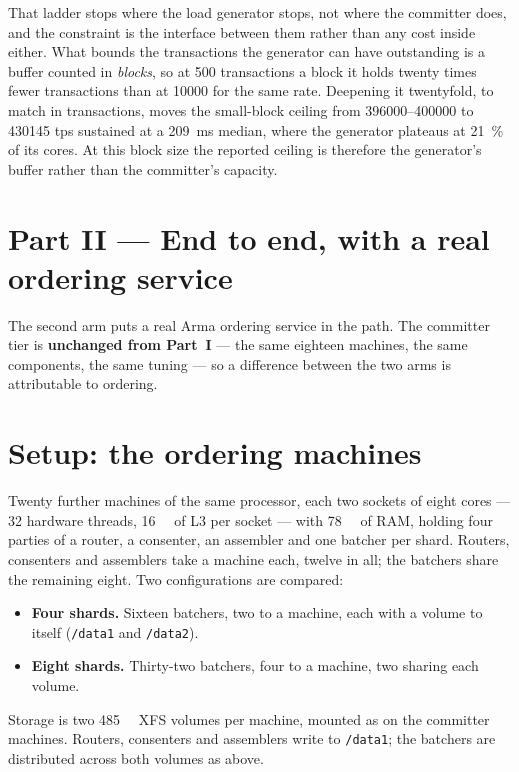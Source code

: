 \documentclass[10pt,twocolumn]{article}
\begin{document}
That ladder stops where the load generator stops, not where the committer does, and the constraint is
the interface between them rather than any cost inside either. What bounds the transactions the generator
can have outstanding is a buffer counted in \emph{blocks}, so at 500 transactions a block it holds
twenty times fewer transactions than at \num{10000} for the same rate. Deepening it twentyfold, to match
in transactions, moves the small-block ceiling from \SIrange{396000}{400000}{} to \num{430145} tps
sustained at a \SI{209}{\milli\second} median, where the generator plateaus at \SI{21}{\percent} of
its cores. At this block size the reported ceiling is therefore the generator's buffer rather than the
committer's capacity.

\section*{Part II --- End to end, with a real ordering service}

The second arm puts a real Arma ordering service in the path. The committer tier is
\textbf{unchanged from Part~I} --- the same eighteen machines, the same components, the same tuning ---
so a difference between the two arms is attributable to ordering.

\section{Setup: the ordering machines}

Twenty further machines of the same processor, each two sockets of eight cores --- 32 hardware
threads, \SI{16}{\mebi\byte} of L3 per socket --- with \SI{78}{\gibi\byte} of RAM, holding four
parties of a router, a
consenter, an assembler and one batcher per shard. Routers, consenters and assemblers take a machine
each, twelve in all; the batchers share the remaining eight. Two configurations are compared:

\begin{itemize}\itemsep2pt
  \item \textbf{Four shards.} Sixteen batchers, two to a machine, each with a volume to itself
  (\texttt{/data1} and \texttt{/data2}).
  \item \textbf{Eight shards.} Thirty-two batchers, four to a machine, two sharing each volume.
\end{itemize}

Storage is two \SI{485}{\gibi\byte} XFS volumes per machine, mounted as on the committer machines.
Routers, consenters and assemblers write to \texttt{/data1}; the batchers are distributed across both
volumes as above.
\end{document}
